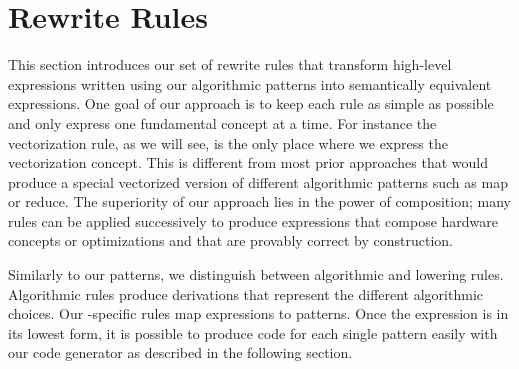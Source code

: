 \section{Rewrite Rules}
\label{section:rules}

This section introduces our set of rewrite rules that transform high-level expressions written using our algorithmic patterns into semantically equivalent expressions.
One goal of our approach is to keep each rule as simple as possible and only express one fundamental concept at a time.
For instance the vectorization rule, as we will see, is the only place where we express the vectorization concept.
This is different from most prior approaches that would produce a special vectorized version of different algorithmic patterns such as map or reduce.
The superiority of our approach lies in the power of composition;
many rules can be applied successively to produce expressions that compose hardware concepts or optimizations and that are provably correct by construction.

Similarly to our patterns, we distinguish between algorithmic and lowering rules.
Algorithmic rules produce derivations that represent the different algorithmic choices.
Our \OpenCL-specific rules map expressions to \OpenCL patterns.
Once the expression is in its lowest form, it is possible to produce \OpenCL code for each single pattern easily with our code generator as described in the following section.




\newenvironment{rerule}[1]%
{\begin{equation}\begin{array}{#1}\ignorespaces}%
{\end{array}\end{equation}%
\ignorespacesafterend}

